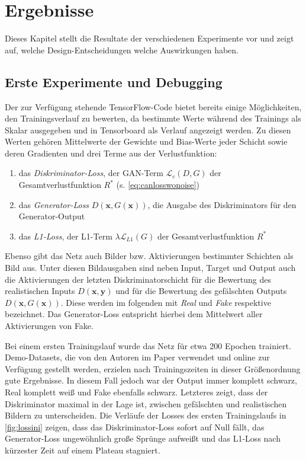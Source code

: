 \chapter{Ergebnisse}

Dieses Kapitel stellt die Resultate der verschiedenen Experimente vor und zeigt auf, welche Design-Entscheidungen welche Auswirkungen haben.



\section{Erste Experimente und Debugging}

Der zur Verfügung stehende TensorFlow-Code bietet bereits einige Möglichkeiten, den Trainingsverlauf zu bewerten, da bestimmte Werte während des Trainings als Skalar ausgegeben und in Tensorboard als Verlauf angezeigt werden.
Zu diesen Werten gehören Mittelwerte der Gewichte und Bias-Werte jeder Schicht sowie deren Gradienten und drei Terme aus der Verlustfunktion:

\begin{enumerate}
	\item das \emph{Diskriminator-Loss}, der GAN-Term $ \mathcal{L}_c(D, G) $ der Gesamtverlustfunktion $ R^* $ (s. \autoref{eq:canlosswonoise})
	\item das \emph{Generator-Loss} $ D(\mathbf{x}, G(\mathbf{x})) $, die Ausgabe des Diskriminators für den Generator-Output
	\item das \emph{L1-Loss}, der L1-Term $ \lambda \mathcal{L}_{L1}(G) $ der Gesamtverlustfunktion $ R^* $
\end{enumerate}

Ebenso gibt das Netz auch Bilder bzw. Aktivierungen bestimmter Schichten als Bild aus.
Unter diesen Bildausgaben sind neben Input, Target und Output auch die Aktivierungen der letzten Diskriminatorschicht für die Bewertung des realistischen Inputs $ D(\mathbf{x}, \mathbf{y}) $ und für die Bewertung des gefälschten Outputs $ D(\mathbf{x}, G(\mathbf{x})) $.
Diese werden im folgenden mit \emph{Real} und \emph{Fake} respektive bezeichnet.
Das Generator-Loss entspricht hierbei dem Mittelwert aller Aktivierungen von Fake.

Bei einem ersten Trainingslauf wurde das Netz für etwa 200 Epochen trainiert.
Demo-Datasets, die von den Autoren im Paper verwendet und online zur Verfügung gestellt werden, erzielen nach Trainingszeiten in dieser Größenordnung gute Ergebnisse.
In diesem Fall jedoch war der Output immer komplett schwarz, Real komplett weiß und Fake ebenfalls schwarz.
Letzteres zeigt, dass der Diskriminator maximal in der Lage ist, zwischen gefälschten und realistischen Bildern zu unterscheiden.
Die Verläufe der Losses des ersten Trainingslaufs in \autoref{fig:lossini} zeigen, dass das Diskriminator-Loss sofort auf Null fällt, das Generator-Loss ungewöhnlich große Sprünge aufweißt und das L1-Loss nach kürzester Zeit auf einem Plateau stagniert.

